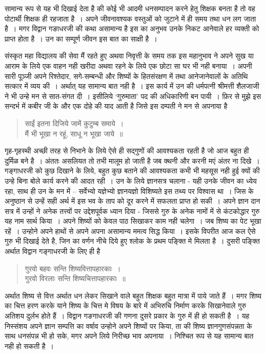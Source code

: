 {सामान्य रूप से यह भी दिखाई देता है की कोई भी आदमी धनसम्पादन करने हेतु शिक्षक बनता है तो वह पोटार्थी शिक्षक ही रहजाता है~। अपने जीवनावश्यक वस्तुओं को जुटाने में ही समय तथा धन लग जाता है~। मगर विद्वान गङाधरजी की कथा असामान्य है इस का अनुभव उनके निकट आनेवाले हर व्यक्ती को प्राप्त होता है~। उन का सम्पूर्ण जीवन इस बात का साक्षी है~।

संस्कृत महा विद्यालय की सेवा मैं रहते हुए अथवा निवृत्ती के समय तक इस महानुभाव ने अपने सुख या आराम के लिये एक वाहन नही खरीदा अथवा रहने के लिये एक छोटा सा घर भी नही बनाया~। अपनी सारी पूञ्जी अपने रिश्तेदार, सगे-सम्बन्धी और शिष्यों के हितसंरक्षण में तथा आनेजानेवालों के अतिथि सत्कार में व्यय की~। अर्थात् यह सामान्य बात नही है~। इस कार्य में उन की धर्मपत्नी श्रीमत्ती शैलजाजी ने भी उन्हे मन से सात-संगत दी~। इसीलिये ‘गुरुमाता’ पद की अधिकारिणी बन पायी~। फ़िर से मुझे इस सन्दर्भ में कबीर जी के और एक दोहे की याद आती है जिसे इस दम्पती ने मन से अपनाया है 
\begin{verse}
साईं इतना दिजिये जामें कुटुम्ब समाये~।\\
मैं भी भूखा न रहूं, साधू न भूखा जाये~॥
\end{verse}
गृह-गृहस्थी अच्छी तरह से निभाने के लिये ऐसे ही सद्गुणों की आवश्यकता रहती है जो आज बहुत ही दुर्मिळ बने है~। अंततः असलियत तो तभी मालूम हो जाती है जब क्थनी और करनी मएं अंतर ना दिखे~। गङ्गाधरजी को कुछ दिखाने के लिये, बहुत कुछ बताने की आवश्यकता कभी भी महसूस नही हुई क्यों की उन्हे बिना बोले कार्य करने की आदत रही~। उन के लिये ज्ञानसत्र चलाना - यही उनके जीवन का ध्येय रहा, साथ ही उन के मन में -- सर्वेभ्यो यज्ञेभ्यो ज्ञानयज्ञो विशिष्यते इस तथ्य पर विश्वास था~। जिस के अनुष्ठान से उन्हें सही अर्थ में इस भव के ताप को दूर करने में सफलता प्राप्त हो सकी~। अपने ज्ञान दान सत्र में उन्हों ने अनेक तत्त्वों पर उद्देशपूर्वक ध्यान दिया - जिससे गुरु के अनेक नामों में से कंटकोद्धार गुरु यह नाम सार्थ किया~। अपने शिष्यों को केवल पाठ सिखाकर काम नही चलेगा~। जब शिष्य का पेट भूखा रहें~। उन्होने अपने हाथों से अपने अपना असामान्य ममत्व सिद्ध किया~। इसके विपरीत आज कल ऐसे गुरु भी दिखाई देते है, जिन का वर्णन नीचे दिये हुए श्लोक के प्रथम पङ्क्ति मे मिलता है~। दुसरी पङ्क्ति अर्थात विद्वान गङ्गाधरजी के लिए ही है  
\begin{verse}
गुरवो बहवः सन्ति शिष्यवित्तापहारकाः~।\\
गुरवो विरलाः सन्ति शिष्यचित्तापहारकाः~॥
\end{verse}
अर्थात शिष्य से वित्त अर्थात धन लेकर सिखाने वाले बहुत शिक्षक बहुत मात्रा में पाये जाते हैं~। मगर शिष्य का चित्त हरण  करके याने शिष्य के चित्त मे विषय के बारे में अभिरुचि निर्माण करके सिखानेवाले गुरु अतिशय दुर्लभ  होते हैं~। विद्वान गङगाधरजी की गणना दुसरे प्रकार के गुरु में ही हो सकती है~। यह निस्संशय अपने ज्ञान सम्पत्ति का वर्षाव उन्होने अपने शिष्यों पर किया, ता की शिष्य ज्ञानगुणसंपन्नता के साथ धनसंपन्न भी हो सके, मगर अपने लिये निरीच्छ भाव अपनाया~। निश्चित रूप से यह सामान्य बात नही हो सकती है~।

}
